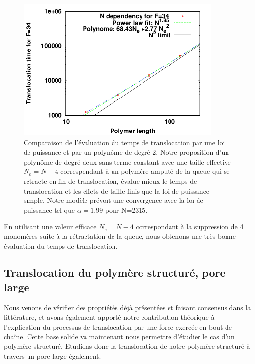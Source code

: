 \begin{figure}[H]
\begin{center}
\includegraphics[width=0.9\textwidth]{ndeppolsimplef34.pdf}

\caption[Comparaison polynôme et loi de puissance]{Comparaison de l'évaluation du temps de translocation par une loi de puissance et par un polynôme de degré 2. Notre proposition d'un polynôme de degré deux sans terme constant avec une taille effective $N_e = N-4$ correspondant à un polymère amputé de la queue qui se rétracte en fin de translocation, évalue mieux le temps de translocation et les effets de taille finis que la loi de puissance simple. Notre modèle prévoit une convergence avec la loi de puissance tel que $\alpha=1.99$ pour N=2315.}
\label{verifpol}
\end{center}
\end{figure}

En utilisant une valeur efficace $N_e=N-4$ correspondant à la suppression de 4 monomères suite à la rétractation de la queue, nous obtenons une très bonne évaluation du temps de translocation.

\newpage

\subsection{Translocation du polymère structuré, pore large}

Nous venons de vérifier des propriétés déjà présentées et faisant consensus dans la littérature, et avons également apporté notre contribution théorique à l'explication du processus de translocation par une force exercée en bout de chaîne. Cette base solide va maintenant nous permettre d'étudier le cas d'un polymère structuré. Etudions donc la translocation de notre polymère structuré à travers un pore large également.\\

